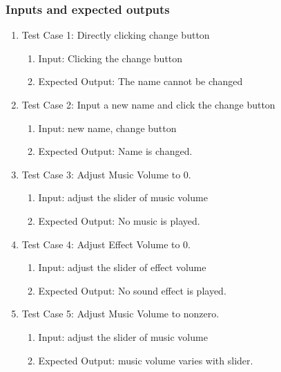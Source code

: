 \documentclass[11pt]{article}
\begin{document}
    \subsubsection*{Inputs and expected outputs}
    \begin{enumerate}
        \item Test Case 1: Directly clicking change button
        \begin{enumerate}
            \item Input: Clicking the change button
            \item Expected Output: The name cannot be changed
        \end{enumerate}
        
        \item Test Case 2: Input a new name and click the change button
        \begin{enumerate}
            \item Input: new name, change button
            \item Expected Output: Name is changed.
        \end{enumerate}
        
        \item Test Case 3: Adjust Music Volume to 0.
        \begin{enumerate}
            \item Input: adjust the slider of music volume
            \item Expected Output: No music is played.
        \end{enumerate}

        \item Test Case 4: Adjust Effect Volume to 0.
        \begin{enumerate}
            \item Input: adjust the slider of effect volume
            \item Expected Output: No sound effect is played.
        \end{enumerate}
        
        \item Test Case 5: Adjust Music Volume to nonzero.
        \begin{enumerate}
            \item Input: adjust the slider of music volume
            \item Expected Output: music volume varies with slider.
        \end{enumerate}


\end{enumerate}
\end{document}
